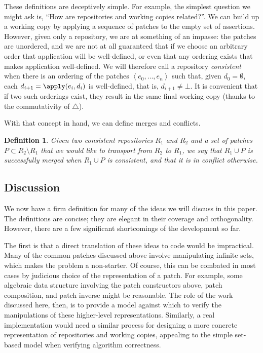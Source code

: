 \documentclass{article}
\newtheorem{definition}{Definition}
\newcommand{\undefined}{\ensuremath{\bot}\xspace}
\newcommand{\symdiff}{\triangle}
\begin{document}
These definitions are deceptively simple. For example, the simplest question
we might ask is, ``How are repositories and working copies related?''. We
can build up a working copy by applying a sequence of patches to the empty
set of assertions. However, given only a repository, we are at something of
an impasse: the patches are unordered, and we are not at all guaranteed that
if we choose an arbitrary order that application will be well-defined, or
even that any ordering exists that makes application well-defined. We will
therefore call a repository \emph{consistent} when there is an ordering of
the patches $\left<e_0,\ldots,e_n\right>$ such that, given $d_0 =
\emptyset$, each $d_{i+1} = \apply(e_i,d_i)$ is well-defined, that is,
$d_{i+1} \ne \undefined$. It is convenient that if two such orderings exist,
they result in the same final working copy (thanks to the commutativity of
$\symdiff$).

With that concept in hand, we can define merges and conflicts.

\begin{definition}
    Given two consistent repositories $R_1$ and $R_2$ and a set of patches
    $P \subset R_2 \setminus R_1$ that we would like to transport from $R_2$
    to $R_1$, we say that $R_1 \cup P$ is successfully \emph{merged} when
    $R_1 \cup P$ is consistent, and that it is in \emph{conflict} otherwise.
\end{definition}


\subsection{Discussion}
We now have a firm definition for many of the ideas we will discuss in this
paper. The definitions are concise; they are elegant in their coverage and
orthogonality. However, there are a few significant shortcomings of the
development so far.

The first is that a direct translation of these ideas to code would be
impractical. Many of the common patches discussed above involve manipulating
infinite sets, which makes the problem a non-starter. Of course, this can be
combated in most cases by judicious choice of the representation of a patch.
For example, some algebraic data structure involving the patch constructors
above, patch composition, and patch inverse might be reasonable. The role of
the work discussed here, then, is to provide a model against which to verify
the manipulations of these higher-level representations. Similarly, a real
implementation would need a similar process for designing a more concrete
representation of repositories and working copies, appealing to the simple
set-based model when verifying algorithm correctness.
\end{document}
